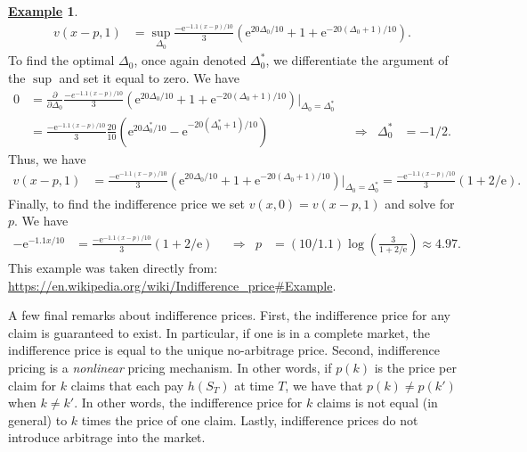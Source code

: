 \documentclass[12pt]{book}
\numberwithin{equation}{chapter}
\theoremstyle{plain}
\numberwithin{theorem}{section}
\theoremstyle{definition}
\newtheorem{example}[theorem]{\underline{Example}}
\numberwithin{exercise}{chapter}
\newcommand{\<}{\langle}
\renewcommand{\>}{\rangle}
\renewcommand{\(}{\left(}
\renewcommand{\)}{\right)}
\renewcommand{\[}{\left[}
\renewcommand{\]}{\right]}
\newcommand\Del{\Delta}
\renewcommand\d{\partial}
\newcommand\ee{\mathrm{e}}
\theoremstyle{definition}
\numberwithin{question}{section}
\begin{document}
\begin{example}
\begin{align}
v(x-p,1)
	&=	\sup_{\Del_0}  \frac{-\ee^{-1.1(x-p)/10}}{3} \( \ee^{ 20 \Del_0 / 10 } + 1 + \ee^{ -20 (\Del_0 + 1) / 10 } \) .
\end{align}
To find the optimal $\Del_0$, once again denoted $\Del_0^*$, we differentiate the argument of the $\sup$ and set it equal to zero.  We have
\begin{align}
0
	&=	\frac{\d}{\d \Del_0} \frac{-e^{-1.1(x-p)/10}}{3} \( \ee^{ 20 \Del_0 / 10 } + 1 + \ee^{ - 20 (\Del_0 + 1) / 10 } \) \Big|_{\Del_0=\Del_0^*} \\
	&=	\frac{-\ee^{-1.1(x-p)/10}}{3} \frac{20}{10}\( \ee^{ 20 \Del_0^* / 10 } - \ee^{ - 20 (\Del_0^* + 1) / 10 } \) &
	&\Rightarrow&
\Del_0^*
	&=	-1/2 .
\end{align}
Thus, we have
\begin{align}
v(x-p,1)
	&=	\frac{-\ee^{-1.1(x-p)/10}}{3} \( \ee^{ 20 \Del_0 / 10 } + 1 + \ee^{ - 20 (\Del_0 + 1) / 10 } \) \Big|_{\Del_0 = \Del_0^*}
	=		\frac{-\ee^{-1.1(x-p)/10}}{3} ( 1 + 2 / \ee ) .
\end{align}
Finally, to find the indifference price we set $v(x,0) = v(x-p,1)$ and solve for $p$.  We have
\begin{align}
-\ee^{-1.1x/10}
	&=	\frac{-\ee^{-1.1(x-p)/10}}{3} ( 1 + 2 / \ee ) &
	&\Rightarrow&
p
	&=	(10/1.1) \log \( \tfrac{3 }{1 + 2/\ee} \) \approx 4.97 .
\end{align}
This example was taken directly from: \url{https://en.wikipedia.org/wiki/Indifference_price#Example}.
\end{example}

\noindent
A few final remarks about indifference prices.  First, the indifference price for any claim is guaranteed to exist.  In particular, if one is in a complete market, the indifference price is equal to the unique no-arbitrage price.  Second, indifference pricing is a \textit{nonlinear} pricing mechanism.  In other words, if $p(k)$ is the price per claim for $k$ claims that each pay $h(S_T)$ at time $T$, we have that $p(k) \neq p(k')$ when $k \neq k'$.  In other words, the indifference price for $k$ claims is not equal (in general) to $k$ times the price of one claim.  Lastly, indifference prices do not introduce arbitrage into the market.
\end{document}
